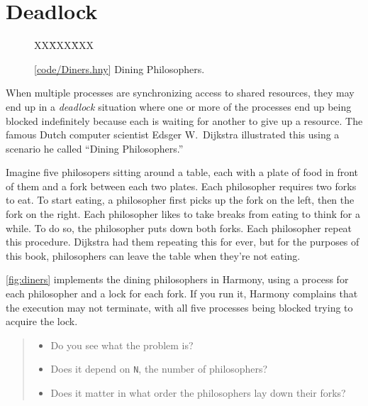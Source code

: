 \documentclass{report}
\newcommand{\harmonysource}[1]{
\begin{tabbing}
XX\=XXX\=XXX\kill
    
\end{tabbing}
}
\newcommand{\harmonylink}[1]{%
[\href{https://www.cs.cornell.edu/home/rvr/harmony/#1}{\underline{#1}}]%
}
\newenvironment{code}{
\tcolorbox
}{
\endtcolorbox
}
\begin{document}
\chapter{Deadlock}
\label{ch:deadlock}
%

%

\begin{figure}
\begin{code}
\harmonysource{Diners}
\end{code}
\caption{\harmonylink{code/Diners.hny} Dining Philosophers.}
\label{fig:diners}
\end{figure}

When multiple processes are synchronizing access to shared resources, they
may end up in a \emph{deadlock} situation where one or more of the processes
end up being blocked indefinitely because each is waiting for another to give
up a resource.
The famous Dutch computer scientist Edsger W.~Dijkstra illustrated this using
a scenario he called ``Dining Philosophers.''
%

Imagine five philosopers sitting around a table, each with a plate of food in
front of them and a fork between each two plates.  Each philosopher requires
two forks to eat.  To start eating, a philosopher first picks up the fork on
the left, then the fork on the right.  Each philosopher likes to take breaks
from eating to think for a while.  To do so, the philosopher puts down both
forks.  Each philosopher repeat this procedure.  Dijkstra had them repeating
this for ever, but for the purposes of this book, philosophers can leave
the table when they're not eating.

\autoref{fig:diners} implements the dining philosophers in Harmony, using a
process for each philosopher and a lock for each fork.  If you
run it, Harmony complains that the execution may not terminate, with all five
processes being blocked trying to acquire the lock.

\begin{quote}
\begin{itemize}
\item Do you see what the problem is?
\item Does it depend on \texttt{N}, the number of philosophers?
\item Does it matter in what order the philosophers lay down their forks?
\end{itemize}
\end{quote}

\end{document}
